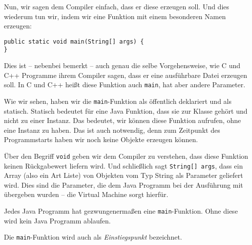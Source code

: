 Nun, wir sagen dem Compiler einfach, dass er diese erzeugen soll. Und dies wiederum tun wir, indem wir eine Funktion mit einem besonderen Namen erzeugen:
\begin{lstlisting}
public static void main(String[] args) {
}
\end{lstlisting}
Dies ist -- nebenbei bemerkt -- auch genau die selbe Vorgehensweise, wie C und C++ Programme ihrem Compiler sagen, dass er eine ausführbare Datei erzeugen soll. In C und C++ heißt diese Funktion auch \texttt{main}, hat aber andere Parameter.

Wie wir sehen, haben wir die \texttt{main}-Funktion als öffentlich deklariert und als statisch. Statisch bedeutet für eine Java Funktion, dass sie zur Klasse gehört und nicht zu einer Instanz. Das bedeutet, wir können diese Funktion aufrufen, ohne eine Instanz zu haben. Das ist auch notwendig, denn zum Zeitpunkt des Programmstarts haben wir noch keine Objekte erzeugen können.

Über den Begriff \texttt{void} geben wir dem Compiler zu verstehen, dass diese Funktion keinen Rückgabewert liefern wird. Und schließlich sagt \texttt{String[] args}, dass ein Array (also ein Art Liste) von Objekten vom Typ String als Parameter geliefert wird. Dies sind die Parameter, die dem Java Programm bei der Ausführung mit übergeben wurden -- die Virtual Machine sorgt hierfür.

Jedes Java Programm hat gezwungenermaßen eine \texttt{main}-Funktion. Ohne diese wird kein Java Programm ablaufen. 

Die \texttt{main}-Funktion wird auch als \emph{Einstiegspunkt} bezeichnet. 